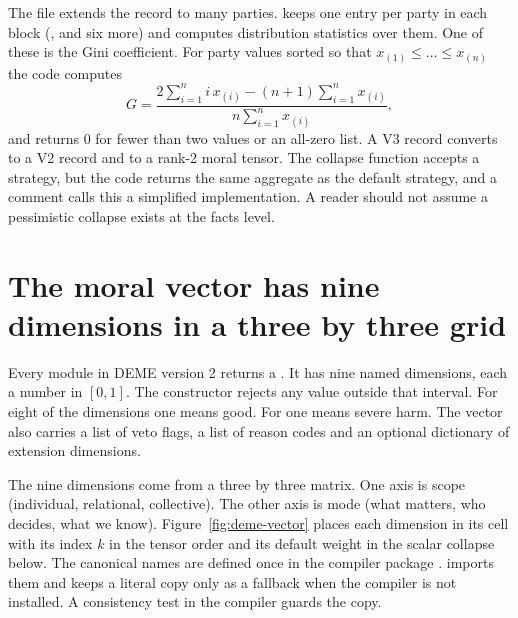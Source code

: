 The file  extends the record to many parties.  keeps one
entry per party in each block (,  and six more) and
computes distribution statistics over them. One of these is the Gini coefficient. For party
values sorted so that $x_{(1)} \le \dots \le x_{(n)}$ the code computes
\begin{equation}
G = \frac{2\sum_{i=1}^{n} i\, x_{(i)} - (n+1)\sum_{i=1}^{n} x_{(i)}}{n \sum_{i=1}^{n} x_{(i)}},
\label{eq:deme-gini}
\end{equation}
and returns $0$ for fewer than two values or an all-zero list. A V3 record converts to a V2
record and to a rank-2 moral tensor. The collapse function 
accepts a  strategy, but the code returns the same aggregate as the default
strategy, and a comment calls this a simplified implementation. A reader should not assume a
pessimistic collapse exists at the facts level.

\section{The moral vector has nine dimensions in a three by three grid}\label{sec:deme-vector}

Every module in DEME version 2 returns a . It has nine named dimensions, each a
number in $[0,1]$. The constructor rejects any value outside that interval. For eight of the
dimensions one means good. For  one means severe harm. The vector also
carries a list of veto flags, a list of reason codes and an optional dictionary of extension
dimensions.

The nine dimensions come from a three by three matrix. One axis is scope (individual, relational,
collective). The other axis is mode (what matters, who decides, what we know).
Figure~\ref{fig:deme-vector} places each dimension in its cell with its index $k$ in the tensor
order and its default weight in the scalar collapse below. The canonical names are defined once
in the compiler package . 
imports them and keeps a literal copy only as a fallback when the compiler is not installed. A
consistency test in the compiler guards the copy.

